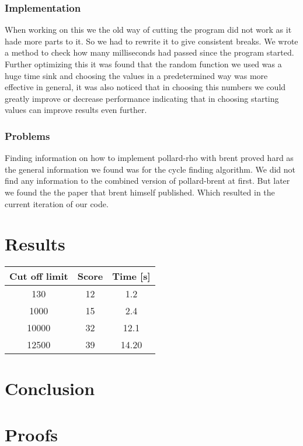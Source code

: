 \documentclass[a4paper, 12pt]{report}
\begin{document}
\subsection{Implementation}
When working on this we the old way of cutting the program did not work as it hade more parts to it. So we had to rewrite it to give consistent breaks. We wrote a method to check how many milliseconds had passed since the program started. Further optimizing this it was found that the random function we used was a huge time sink and choosing the values in a predetermined way was more effective in general, it was also noticed that in choosing this numbers we could greatly improve or decrease performance indicating that in choosing starting values can improve results even further.

\subsection{Problems}
Finding information on how to implement pollard-rho with brent proved hard as the general information we found was for the cycle finding algorithm. We did not find any information to the combined version of pollard-brent at first. But later we found the the paper that brent himself published. Which resulted in the current iteration of our code\cite{brentpdf}.
\chapter{Results}

\begin{tabular} {c c c}
Cut off limit 	&	 Score 	& Time [s] \\ \hline
130		&	12		& 1.2 \\
1000	&	15		& 2.4 \\
10000 	& 	32		& 12.1 \\
12500	&	39		&14.20 \\

\end{tabular}
\chapter{Conclusion}
\appendix
\chapter{Proofs}
\end{document}
